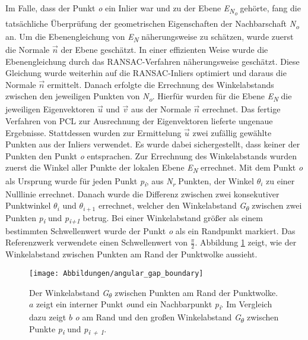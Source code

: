 Im Falle, dass der Punkt \textit{o} ein Inlier war und zu der Ebene \textit{E\textsubscript{N\textsubscript{o}}} gehörte, fang die tatsächliche Überprüfung der geometrischen Eigenschaften der Nachbarschaft \textit{N\textsubscript{o}} an. Um die Ebenengleichung von \textit{E\textsubscript{N}} näherungsweise zu schätzen, wurde zuerst die Normale \textit{$\vec{n}$} der Ebene geschätzt. In einer effizienten Weise wurde die Ebenengleichung durch das RANSAC-Verfahren näherungsweise geschätzt. Diese Gleichung wurde weiterhin auf die RANSAC-Inliers optimiert und daraus die Normale \textit{$\vec{n}$} ermittelt. Danach erfolgte die Errechnung des Winkelabstands zwischen den jeweiligen Punkten von \textit{N\textsubscript{o}}. Hierfür wurden für die Ebene \textit{E\textsubscript{N}} die jeweiligen Eigenvektoren $\vec{u}$ und $\vec{v}$ aus der Normale $\vec{n}$ errechnet. Das fertige Verfahren von PCL zur Ausrechnung der Eigenvektoren lieferte ungenaue Ergebnisse. Stattdessen wurden zur Ermittelung \textit{$\vec{u}$} zwei zufällig gewählte Punkten aus der Inliers verwendet. Es wurde dabei sichergestellt, dass keiner der Punkten den Punkt \textit{o} entsprachen. Zur Errechnung des Winkelabstands wurden zuerst die Winkel aller Punkte der lokalen Ebene \textit{E\textsubscript{N}} errechnet. Mit dem Punkt \textit{o} als Ursprung wurde für jeden Punkt \textit{p\textsubscript{i}}, aus \textit{N\textsubscript{r}} Punkten, der Winkel \textit{$\theta_i$} zu einer Nulllinie errechnet. Danach wurde die Differenz zwischen zwei konsekutiver Punktwinkel $\theta_i$ und $\theta_{i+1}$ errechnet, welcher den Winkelabstand \textit{G\textsubscript{$\theta$}} zwischen zwei Punkten \textit{p\textsubscript{i}} und \textit{p\textsubscript{i+1}} betrug. Bei einer Winkelabstand größer als einem bestimmten Schwellenwert wurde der Punkt \textit{o} als ein Randpunkt markiert. Das Referenzwerk verwendete einen Schwellenwert von $\frac{\pi}{2}$. Abbildung \ref{edge_boundary} zeigt, wie der Winkelabstand zwischen Punkten am Rand der Punktwolke aussieht.

\begin{figure}[h]
	\texttt{[image: Abbildungen/angular\_gap\_boundary]}
	\centering
	\caption{Der Winkelabstand \textit{G\textsubscript{$\theta$}} zwischen Punkten am Rand der Punktwolke. \textbf{\(a\)} zeigt ein interner Punkt \textit{o}und ein Nachbarpunkt \textit{p\textsubscript{i}}. Im Vergleich dazu zeigt \textbf{\(b\)} \textit{o} am Rand und den großen Winkelabstand \textit{G\textsubscript{$\theta$}} zwischen Punkte \textit{p\textsubscript{i}} und \textit{p\textsubscript{i + 1}}. \autocite{ni_edge_2016}}
	\label{edge_boundary}
\end{figure}

